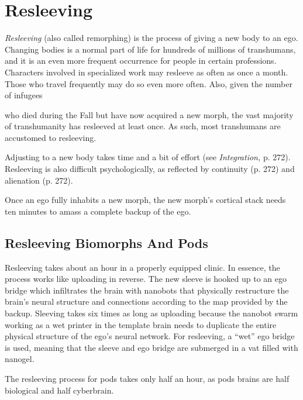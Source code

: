 \section{Resleeving} 

\textit{Resleeving} (also called remorphing) is the process of giving a new body to an ego. Changing bodies is a normal part of life for hundreds of millions of transhumans, and it is an even more frequent occurrence for people in certain professions. Characters involved in specialized work may resleeve as often as once a month. Those who travel frequently may do so even more often. Also, given the number of infugees 

who died during the Fall but have now acquired a new morph, the vast majority of transhumanity has resleeved at least once. As such, most transhumans are accustomed to resleeving. 

Adjusting to a new body takes time and a bit of effort (see \textit{Integration,} p. 272). Resleeving is also difficult psychologically, as reflected by continuity (p. 272) and alienation (p. 272). 

Once an ego fully inhabits a new morph, the new morph's cortical stack needs ten minutes to amass a complete backup of the ego. 

\subsection{Resleeving Biomorphs And Pods} 

Resleeving takes about an hour in a properly equipped clinic. In essence, the process works like uploading in reverse. The new sleeve is hooked up to an ego bridge which infiltrates the brain with nanobots that physically restructure the brain's neural structure and connections according to the map provided by the backup. Sleeving takes six times as long as uploading because the nanobot swarm working as a wet printer in the template brain needs to duplicate the entire physical structure of the ego's neural network. For resleeving, a ``wet'' ego bridge is used, meaning that the sleeve and ego bridge are submerged in a vat filled with nanogel. 

The resleeving process for pods takes only half an hour, as pods brains are half biological and half cyberbrain. 

